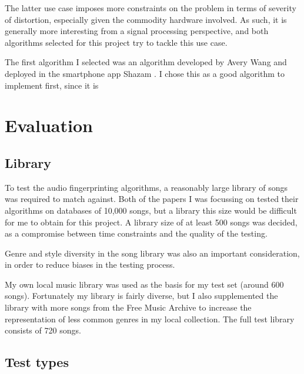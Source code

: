 \documentclass[12pt,a4paper,twoside,openright]{report}
\begin{document}
The latter use case imposes more constraints on the problem in terms of severity of distortion, especially given the commodity hardware involved. As such, it is generally more interesting from a signal processing perspective, and both algorithms selected for this project try to tackle this use case.

The first algorithm I selected was an algorithm developed by Avery Wang and deployed in the smartphone app Shazam \cite{Wang03}. I chose this as a good algorithm to implement first, since it is 




\section{Evaluation}

\subsection{Library}

To test the audio fingerprinting algorithms, a reasonably large library of songs was required to match against. Both of the papers I was focussing on tested their algorithms on databases of 10,000 songs, but a library this size would be difficult for me to obtain for this project. A library size of at least 500 songs was decided, as a compromise between time constraints and the quality of the testing.

Genre and style diversity in the song library was also an important consideration, in order to reduce biases in the testing process.

My own local music library was used as the basis for my test set (around 600 songs). Fortunately my library is fairly diverse, but I also supplemented the library with more songs from the Free Music Archive to increase the representation of less common genres in my local collection. The full test library consists of 720 songs.

\subsection{Test types}
\end{document}

